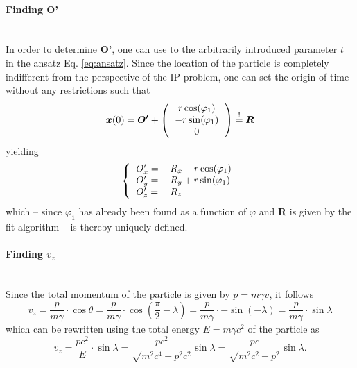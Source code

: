 \paragraph{Finding \textbf{O'}}\mbox{}\\
In order to determine \textbf{O'}, one can use to the arbitrarily introduced parameter $t$ in the ansatz Eq. \ref{eq:ansatz}. Since the location of the particle is completely indifferent from the perspective of the IP problem, one can set the origin of time without any restrictions such that
\begin{equation}
	\boldsymbol{x}(0) = \boldsymbol{O'} +  \left(\begin{tabular}{c}
	$r\cos(\varphi_1) $\\ 
	$-r\sin(\varphi_1) $\\ 
	$0$\\
	\end{tabular} \right) \stackrel{!}{=} \boldsymbol{R}
\end{equation}
yielding
\begin{equation}
	\left\lbrace\begin{tabular}{ll}
	$O'_x =$&$R_x-r\cos(\varphi_1) $\\ 
	$O'_y =$&$R_y+r\sin(\varphi_1) $\\ 
	$O'_z =$&$R_z$\\
	\end{tabular} \right.
\end{equation}
which -- since $\varphi_1$ has already been found as a function of $\varphi$ and \textbf{R} is given by the fit algorithm -- is thereby uniquely defined.
\paragraph{Finding $v_z$}\mbox{}\\
Since the total momentum of the particle is given by $p = m\gamma v$, it follows
\begin{equation}
	v_z = \frac{p}{m\gamma}\cdot\cos\theta = \frac{p}{m\gamma}\cdot\cos\left(\frac{\pi}{2}-\lambda\right) =\frac{p}{m\gamma}\cdot -\sin(-\lambda) =  \frac{p}{m\gamma}\cdot\sin\lambda 
\end{equation}
which can be rewritten using the total energy $E=m\gamma c^2$ of the particle as
\begin{equation}
	v_z = \frac{pc^2}{E} \cdot \sin\lambda = \frac{pc^2}{\sqrt{m^2c^4+p^2c^2}} \sin\lambda = \frac{pc}{\sqrt{m^2c^2+p^2}} \sin\lambda.
\end{equation}
